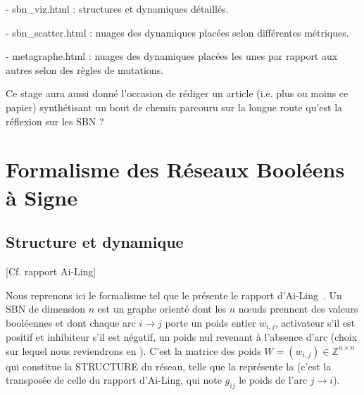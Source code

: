 \documentclass[12pt, a4paper]{article}
\begin{document}
- sbn\_viz.html : structures et dynamiques détaillés.

- sbn\_scatter.html : nuages des dynamiques placées selon différentes métriques.

- metagraphe.html : nuages des dynamiques placées les unes par rapport aux autres selon des règles de mutations. 

Ce stage aura aussi donné l'occasion de rédiger un article (i.e. plus ou moins ce papier) synthétisant un bout de chemin parcouru sur la longue route qu'est la réflexion sur les SBN ?


\section{Formalisme des Réseaux Booléens à Signe}
\label{sec:formalisme}

\subsection{Structure et dynamique}
\label{sec:structure-dynamique}

[Cf. rapport Ai-Ling]

Nous reprenons ici le formalisme tel que le présente le rapport d'Ai-Ling~\cite{bonnet2023}.
Un SBN de dimension $n$ est un graphe orienté dont les $n$ nœuds prennent des valeurs booléennes et dont chaque arc $i \to j$ porte un poids entier $w_{i,j}$, activateur s'il est positif et inhibiteur s'il est négatif, un poids nul revenant à l'absence d'arc (choix sur lequel nous reviendrons en ).
C'est la matrice des poids $W = (w_{i,j}) \in \mathbb{Z}^{n \times n}$ qui constitue la STRUCTURE du réseau, telle que la représente la  (c'est la transposée de celle du rapport d'Ai-Ling, qui note $g_{ij}$ le poids de l'arc $j \to i$).
\end{document}
